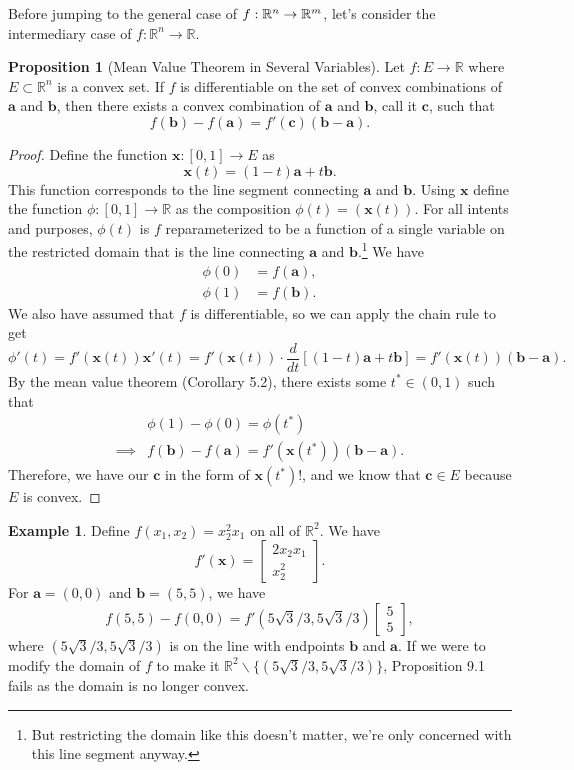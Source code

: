 \documentclass{article}
\newcommand{\R}{\mathbb{R}}
\newcommand{\x}{\mathbf{x}}
\newcommand{\f}{\mathbf{f}}
\renewcommand{\b}{\mathbf{b}}
\renewcommand{\c}{\mathbf{c}}
\renewcommand{\a}{\mathbf{a}}
\theoremstyle{definition}
\newtheorem{proposition}{Proposition}[section]
\newtheorem{example}{Example}[section]
\begin{document}
	Before jumping to the general case of $ \mathbf\f: \R^n\to \R^m $, let's consider the intermediary case of $ f:\R^n\to\R $.
	\begin{proposition}[Mean Value Theorem in Several Variables]
		Let $ f:E\to\R $ where $ E\subset\R^n $ is a convex set. If $ f $ is differentiable on the set of convex combinations of $ \mathbf a $ and $ \mathbf b $, then there exists a convex combination of $ \mathbf a $ and $ \mathbf b $, call it $ \mathbf c $, such that 
		$$ f(\mathbf b)-f(\mathbf a)=f'(\mathbf c)(\mathbf b - \mathbf a).$$
	\end{proposition}
	\begin{proof}
		Define the function $ \x:[0,1]\to E $ as $$\x(t)= (1-t)\a + t\b .$$ This function corresponds to the line segment connecting $ \a $ and $ \b $. Using $ \x $ define the function $ \phi:[0,1]\to\R $ as the composition $ \phi(t)=(\x(t)) $. For all intents and purposes, $ \phi(t) $ is $ f $ reparameterized to be a function of a single variable on the restricted domain that is the line connecting $ \a $ and $ \b $.\footnote{But restricting the domain like this doesn't matter, we're only concerned with this line segment anyway.} We have 
		\begin{align*}
			\phi(0) & = f(\a),\\
			\phi(1) & = f(\b).
		\end{align*}
		We also have assumed that $ f $ is differentiable, so we can apply the chain rule to get 
		$$ \phi'(t) = f'(\x(t))\x'(t) = f'(\x(t))\cdot \frac{d}{dt}[(1-t)\a + t\b] = f'(\x(t))(\b - \a) .$$ 
		By the mean value theorem (Corollary 5.2), there exists some $ t^*\in(0,1) $ such that 
		\begin{align*}
			&\phi(1)- \phi(0) = \phi(t^*)\\
			\implies & f(\b) - f(\a) = f'(\x(t^*))(\b - \a) .
		\end{align*}
		Therefore, we have our $ \c $ in the form of $ \x(t^*) $!, and we know that $ \c \in E $ because $ E $ is convex. 
	\end{proof}
	\begin{example}
		Define $ f(x_1,x_2)=x_2^2x_1 $ on all of $ \R^2 $. We have $$ f'(\x) = \begin{bmatrix}
			2x_2x_1\\x_2^2
		\end{bmatrix}.$$ For $ \a = (0,0) $ and $  \b = (5,5) $, we have $$  f(5,5)-f(0,0)=f'\left(5\sqrt{3}/3,5\sqrt{3}/3\right)\begin{bmatrix}
			5\\5
		\end{bmatrix},$$ where $ (5\sqrt{3}/3,5\sqrt{3}/3) $ is on the line with endpoints $ \b $ and $ \a $.  If we were to modify the domain of $ f $ to make it $ \R^2 \backslash\{(5\sqrt{3}/3,5\sqrt{3}/3)\} $, Proposition 9.1 fails as the domain is no longer convex.
	\end{example}
	
\end{document}
